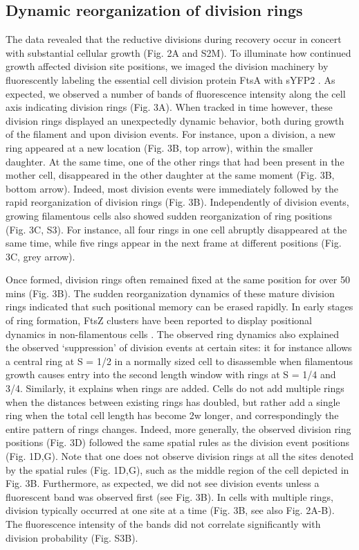 \subsection{Dynamic reorganization of division rings}
The data revealed that the reductive divisions during recovery occur in concert with substantial cellular growth (Fig. 2A and S2M). To illuminate how continued growth affected division site positions, we imaged the division machinery by fluorescently labeling the essential cell division protein FtsA with sYFP2 \cite{Erickson2010, Lutkenhaus2012}. As expected, we observed a number of bands of fluorescence intensity along the cell axis indicating division rings \cite{Addinall1997, Arjes2014, Mileykovskaya1998}  (Fig. 3A). When tracked in time however, these division rings displayed an unexpectedly dynamic behavior, both during growth of the filament and upon division events. For instance, upon a division, a new ring appeared at a new location (Fig. 3B, top arrow), within the smaller daughter. At the same time, one of the other rings that had been present in the mother cell, disappeared in the other daughter at the same moment (Fig. 3B, bottom arrow). Indeed, most division events were immediately followed by the rapid reorganization of division rings (Fig. 3B). Independently of division events, growing filamentous cells also showed sudden reorganization of ring positions (Fig. 3C, S3). For instance, all four rings in one cell abruptly disappeared at the same time, while five rings appear in the next frame at different positions (Fig. 3C, grey arrow).

Once formed, division rings often remained fixed at the same position for over 50 mins (Fig. 3B). The sudden reorganization dynamics of these mature division rings indicated that such positional memory can be erased rapidly. In early stages of ring formation, FtsZ clusters have been reported to display positional dynamics in non-filamentous cells \cite{Tsukanov2011}. The observed ring dynamics also explained the observed ‘suppression’ of division events at certain sites: it for instance allows a central ring at S = 1/2 in a normally sized cell to disassemble when filamentous growth causes entry into the second length window with rings at S = 1/4 and 3/4. Similarly, it explains when rings are added. Cells do not add multiple rings when the distances between existing rings has doubled, but rather add a single ring when the total cell length has become 2w longer, and correspondingly the entire pattern of rings changes. Indeed, more generally, the observed division ring positions (Fig. 3D) followed the same spatial rules as the division event positions (Fig. 1D,G). Note that one does not observe division rings at all the sites denoted by the spatial rules (Fig. 1D,G), such as the middle region of the cell depicted in Fig. 3B. Furthermore, as expected, we did not see division events unless a fluorescent band was observed first (see Fig. 3B). In cells with multiple rings, division typically occurred at one site at a time (Fig. 3B, see also Fig. 2A-B). The fluorescence intensity of the bands did not correlate significantly with division probability (Fig. S3B). 

